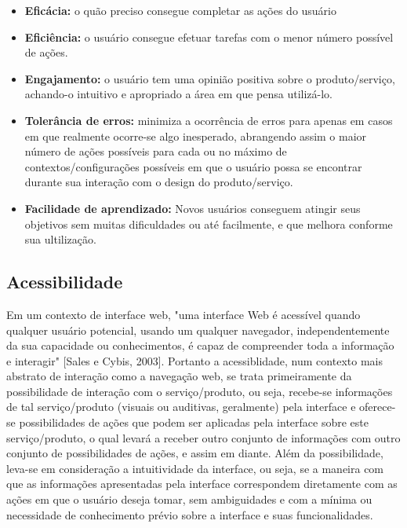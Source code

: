 \documentclass[12pt]{article}
\begin{document}
\begin{itemize}

    \item 
    \textbf{Eficácia:} o quão preciso consegue completar as ações do usuário
						    
    \item
    \textbf{Eficiência:} o usuário consegue efetuar tarefas com o menor número possível de ações.
							        
    \item 
    \textbf{Engajamento:} o usuário tem uma opinião positiva sobre o produto/serviço, achando-o intuitivo e apropriado a área em que pensa utilizá-lo.
									    
    \item
    \textbf{Tolerância de erros:} minimiza a ocorrência de erros para apenas em casos em que realmente ocorre-se algo inesperado, abrangendo assim o maior número de ações possíveis para cada ou no máximo de contextos/configurações possíveis em que o usuário possa se encontrar durante sua interação com o design do produto/serviço.
												\item
    \textbf{Facilidade de aprendizado:} Novos usuários conseguem atingir seus objetivos sem muitas dificuldades ou até facilmente, e que melhora conforme sua ultilização. 

											    \end{itemize}

											    \subsection{Acessibilidade}
												Em um contexto de interface web, "uma interface Web é acessível quando qualquer usuário potencial, usando um qualquer navegador, independentemente da sua capacidade ou conhecimentos, é capaz de compreender toda a informação e interagir" [Sales e Cybis, 2003]. Portanto a acessiblidade, num contexto mais abstrato de interação como a navegação web, se trata primeiramente da possibilidade de interação com o serviço/produto, ou seja, recebe-se informações de tal serviço/produto (visuais ou auditivas, geralmente) pela interface e oferece-se possibilidades de ações que podem ser aplicadas pela interface sobre este serviço/produto, o qual levará a receber outro conjunto de informações com outro conjunto de possibilidades de ações, e assim em diante. Além da possibilidade, leva-se em consideração a intuitividade da interface, ou seja, se a maneira com que as informações apresentadas pela interface correspondem diretamente com as ações em que o usuário deseja tomar, sem ambiguidades e com a mínima ou necessidade de conhecimento prévio sobre a interface e suas funcionalidades.
\end{document}
